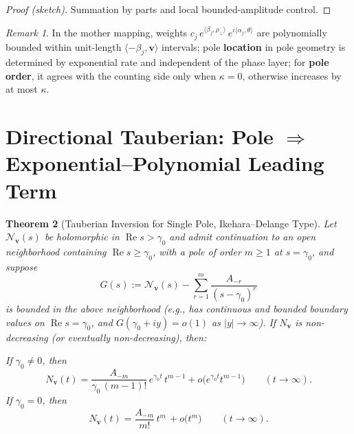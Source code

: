 \documentclass[11pt,a4paper]{article}
\newtheorem{theorem}{Theorem}[section]
\theoremstyle{remark}
\newtheorem{remark}[theorem]{Remark}
\DeclareMathOperator{\Re}{Re}
\begin{document}
\begin{proof}[Proof (sketch)]
Summation by parts and local bounded-amplitude control.
\end{proof}

\begin{remark}
In the mother mapping, weights $c_j\,e^{\langle\beta_j,\rho_\perp\rangle}\,e^{i\langle\alpha_j,\theta\rangle}$ are polynomially bounded within unit-length $\langle-\beta_j,\mathbf{v}\rangle$ intervals; pole \textbf{location} in pole geometry is determined by exponential rate and independent of the phase layer; for \textbf{pole order}, it agrees with the counting side only when $\kappa=0$, otherwise increases by at most $\kappa$.
\end{remark}

\section{Directional Tauberian: Pole $\Rightarrow$ Exponential--Polynomial Leading Term}

\begin{theorem}[Tauberian Inversion for Single Pole, Ikehara--Delange Type]\label{thm:tauberian}
Let $\mathscr{N}_{\mathbf{v}}(s)$ be holomorphic in $\Re s>\gamma_0$ and admit continuation to an open neighborhood containing $\Re s\ge\gamma_0$, with a pole of order $m\ge1$ at $s=\gamma_0$, and suppose
\begin{equation}
G(s):=\mathscr{N}_{\mathbf{v}}(s)-\sum_{r=1}^{m}\frac{A_{-r}}{(s-\gamma_0)^r}
\end{equation}
is bounded in the above neighborhood (e.g., has continuous and bounded boundary values on $\Re s=\gamma_0$, and $G(\gamma_0+iy)=o(1)$ as $|y|\to\infty$). If $N_{\mathbf{v}}$ is non-decreasing (or eventually non-decreasing), then:

If $\gamma_0\ne 0$, then
\begin{equation}
N_{\mathbf{v}}(t)=\frac{A_{-m}}{\gamma_0\,(m-1)!}\,e^{\gamma_0 t}\,t^{m-1}
+o\big(e^{\gamma_0 t}t^{m-1}\big)\qquad (t\to\infty).
\end{equation}
If $\gamma_0=0$, then
\begin{equation}
N_{\mathbf{v}}(t)=\frac{A_{-m}}{m!}\,t^{m}\,+o\big(t^{m}\big)\qquad (t\to\infty).
\end{equation}
\end{theorem}
\end{document}
